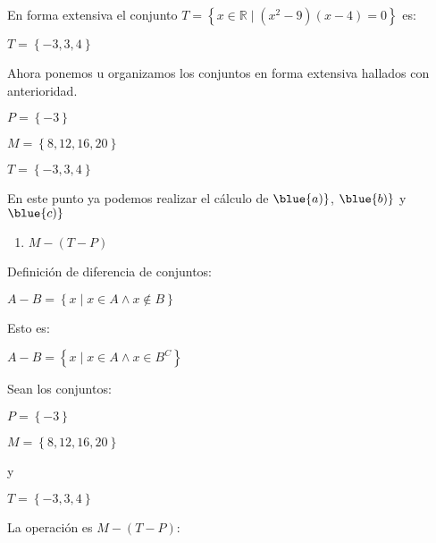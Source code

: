 \documentclass[12pt]{article}
\begin{document}
En forma extensiva el conjunto  $T= \left\{x \in \mathbb{R} \mid (x^2-9)(x-4)=0\right\}$  es:
\begin{center}
    $T= \left\{-3,3,4\right\}$ 
\end{center}

Ahora ponemos u organizamos los conjuntos en forma extensiva hallados con anterioridad. 

\begin{center}
     $P= \left\{-3\right\}$
\end{center}
\begin{center}
     $M= \left\{8, 12, 16, 20\right\}$ 
\end{center}

\begin{center}
    $T= \left\{-3,3,4\right\}$ 
\end{center}

En este punto ya podemos realizar el cálculo de $\blue{a)}$, $\blue{b)}$ y $\blue{c)}$

\newpage

{}

\begin{enumerate}
        \item [\blue{a)}] $M-(T-P)$
\end{enumerate}

Definición de diferencia de conjuntos:

\begin{center}
     $A-B= \left\{x\mid x \in A \wedge x \notin  B \right\}$
\end{center}
\begin{center}
    Esto es: 
\end{center}
\begin{center}
    $A-B= \left\{x\mid x \in A \wedge x \in  B^{C} \right\}$ 
\end{center}

Sean los conjuntos:

\begin{center}
     $P= \left\{-3\right\}$ 
\end{center}
\begin{center}
     $M= \left\{8, 12, 16, 20\right\}$ 
\end{center}
\begin{center}
     y
\end{center}
\begin{center}
     $T= \left\{-3,3,4\right\}$  
\end{center}
La operación es $M-(T-P)$:
\end{document}
